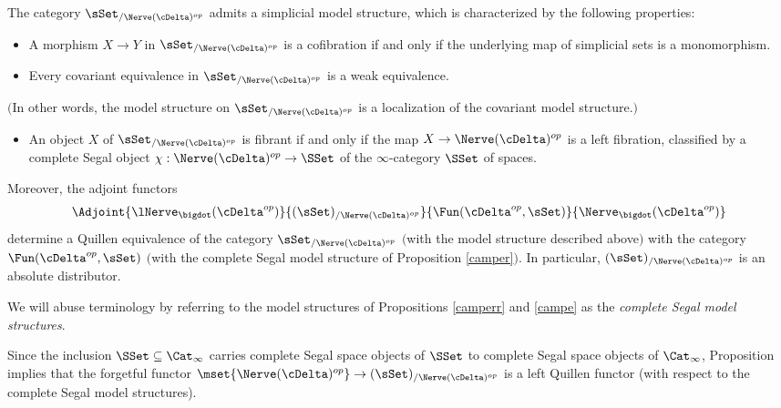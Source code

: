 \begin{proposition}\label{campe}
The category $\sSet_{/\Nerve( \cDelta)^{op}}$ admits a simplicial model structure, which is
characterized by the following properties:
\begin{itemize}
\item[$(C)$] A morphism $X \rightarrow Y$ in $\sSet_{/\Nerve( \cDelta)^{op}}$
is a cofibration if and only if the underlying map of simplicial sets is a monomorphism.

\item[$(W)$] Every covariant equivalence in $\sSet_{/\Nerve( \cDelta)^{op}}$ is a
weak equivalence.
\end{itemize}
$($In other words, the model structure on $\sSet_{/\Nerve( \cDelta)^{op}}$ is a localization
of the covariant model structure.$)$
\begin{itemize}
\item[$(F)$] An object $X$ of $\sSet_{/\Nerve( \cDelta)^{op}}$ is
fibrant if and only if the map $X \rightarrow \Nerve(\cDelta)^{op}$ is a left fibration,
classified by a complete Segal object $\chi: \Nerve(\cDelta)^{op} \rightarrow \SSet$
of the $\infty$-category $\SSet$ of spaces.
\end{itemize}
Moreover, the adjoint functors
$$ \Adjoint{ \lNerve_{\bigdot}( \cDelta^{op}) }{ (\sSet)_{/ \Nerve(\cDelta)^{op}} }{
\Fun( \cDelta^{op}, \sSet)}{\Nerve_{\bigdot}( \cDelta^{op})}$$
determine a Quillen equivalence of the category $\sSet_{/\Nerve( \cDelta)^{op}}$
$($with the model structure described above$)$ with the category $\Fun( \cDelta^{op}, \sSet)$
$($with the complete Segal model structure of Proposition \ref{camper}$)$.
In particular, $(\sSet)_{/ \Nerve(\cDelta)^{op} }$ is an absolute distributor.
\end{proposition}

We will abuse terminology by referring to the model structures of Propositions \ref{camperr} and \ref{campe} as the {\it complete Segal model structures}.

\begin{remark}\label{cooperr}
Since the inclusion $\SSet \subseteq \Cat_{\infty}$ carries complete Segal space objects of
$\SSet$ to complete Segal space objects of $\Cat_{\infty}$, Proposition  implies
that the forgetful functor $\mset{ \Nerve(\cDelta)^{op} } \rightarrow (\sSet)_{/ \Nerve(\cDelta)^{op} }$ is a left Quillen functor (with respect to the complete Segal model structures).
\end{remark}

